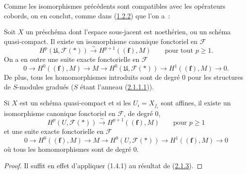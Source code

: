 Comme les isomorphismes précédents sont compatibles avec les opérateurs
cobords, on en conclut, comme dans
(\hyperref[III.1.2.2-fr]{1.2.2}) que l'on a~:

\begin{proposition}[2.1.3]
\label{III.2.1.3-fr}
Soit $X$ un préschéma dont l'espace sous-jacent est noethérien, ou un schéma
quasi-compact. Il existe un isomorphisme canonique fonctoriel en $\mathcal F$
\begin{equation}
\label{III.2.1.3.1-fr}
\tag{2.1.3.1}
H^p(\mathfrak U,\mathcal F(*))
\xrightarrow{\sim}H^{p+1}((\mathbf f),M)
\qquad\text{pour tout }p\geq1.
\end{equation}
On a en outre une suite exacte fonctorielle en $\mathcal F$
\begin{equation}
\label{III.2.1.3.2-fr}
\tag{2.1.3.2}
0\longrightarrow H^0((\mathbf f),M)\longrightarrow M
\longrightarrow H^0(\mathfrak U,\mathcal F(*))
\longrightarrow H^1((\mathbf f),M)\longrightarrow0.
\end{equation}
De plus, tous les homomorphismes introduits sont de degré $0$ pour les
structures de $S$-modules gradués ($S$ étant l'anneau
(\hyperref[III.2.1.1.1-fr]{2.1.1.1})).
\end{proposition}
\providecommand{\bbGamma}{\boldsymbol{\Gamma}}
\providecommand{\shProj}{\mathcal{P}\mathit{roj}}

\begin{corollary}[2.1.4]
\label{III.2.1.4-fr}
Si $X$ est un schéma quasi-compact et si les $U_i=X_{f_i}$ sont affines,
il existe un isomorphisme canonique fonctoriel en $\mathcal F$, de degré $0$,
\begin{equation}
\label{III.2.1.4.1-fr}
\tag{2.1.4.1}
H^p(U,\mathcal F(*))\xrightarrow{\sim}H^{p+1}((\mathbf f),M)
\qquad\text{pour }p\geq1
\end{equation}
et une suite exacte fonctorielle en $\mathcal F$
\begin{equation}
\label{III.2.1.4.2-fr}
\tag{2.1.4.2}
0\longrightarrow H^0((\mathbf f),M)\longrightarrow M
\longrightarrow H^0(U,\mathcal F(*))
\longrightarrow H^1((\mathbf f),M)\longrightarrow0
\end{equation}
où tous les homomorphismes sont de degré $0$.
\end{corollary}

\begin{proof}
Il suffit en effet d'appliquer (1.4.1) au résultat de
(\hyperref[III.2.1.3-fr]{2.1.3}).
\end{proof}

